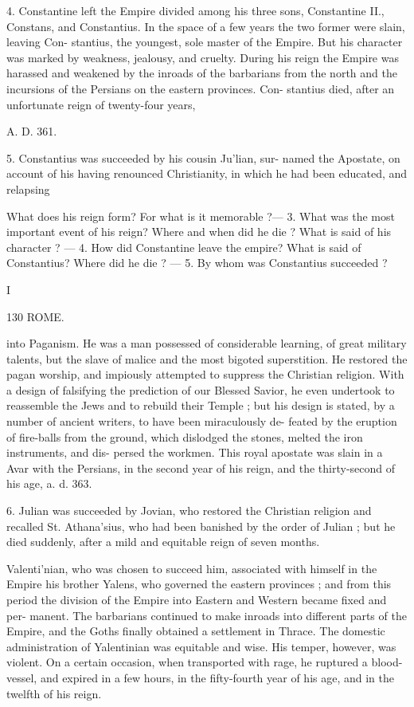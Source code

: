 \documentclass[openany,a4paper]{memoir}
\begin{document}
4. Constantine left the Empire divided among his three 
sons, Constantine II., Constans, and Constantius. In the 
space of a few years the two former were slain, leaving Con- 
stantius, the youngest, sole master of the Empire. But his 
character was marked by weakness, jealousy, and cruelty. 
During his reign the Empire was harassed and weakened 
by the inroads of the barbarians from the north and the 
incursions of the Persians on the eastern provinces. Con- 
stantius died, after an unfortunate reign of twenty-four years, 

A. D. 361. 

5. Constantius was succeeded by his cousin Ju'lian, sur- 
named the Apostate, on account of his having renounced 
Christianity, in which he had been educated, and relapsing 

What does his reign form? For what is it memorable ?— 3. What 
was the most important event of his reign? Where and when did he 
die ? What is said of his character ? — 4. How did Constantine leave 
the empire? What is said of Constantius? Where did he die ? — 5. By 
whom was Constantius succeeded ? 

I 



130 ROME. 

into Paganism. He was a man possessed of considerable 
learning, of great military talents, but the slave of malice 
and the most bigoted superstition. He restored the pagan 
worship, and impiously attempted to suppress the Christian 
religion. With a design of falsifying the prediction of our 
Blessed Savior, he even undertook to reassemble the Jews 
and to rebuild their Temple ; but his design is stated, by a 
number of ancient writers, to have been miraculously de- 
feated by the eruption of fire-balls from the ground, which 
dislodged the stones, melted the iron instruments, and dis- 
persed the workmen. This royal apostate was slain in a Avar 
with the Persians, in the second year of his reign, and the 
thirty-second of his age, a. d. 363. 

6. Julian was succeeded by Jovian, who restored the 
Christian religion and recalled St. Athana'sius, who had been 
banished by the order of Julian ; but he died suddenly, after 
a mild and equitable reign of seven months. 

Valenti'nian, who was chosen to succeed him, associated 
with himself in the Empire his brother Yalens, who governed 
the eastern provinces ; and from this period the division of 
the Empire into Eastern and Western became fixed and per- 
manent. The barbarians continued to make inroads into 
different parts of the Empire, and the Goths finally obtained 
a settlement in Thrace. The domestic administration of 
Yalentinian was equitable and wise. His temper, however, 
was violent. On a certain occasion, when transported with 
rage, he ruptured a blood-vessel, and expired in a few hours, 
in the fifty-fourth year of his age, and in the twelfth of his 
reign. 
\end{document}
